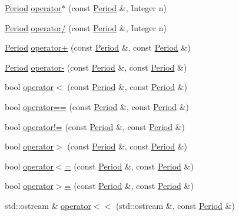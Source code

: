 \begin{DoxyCompactItemize}
\item 
\hyperlink{class_math_fin_1_1_period}{Period} \hyperlink{class_math_fin_1_1_period_adea95d933011d667b70490b0ecbf4642}{operator$\ast$} (const \hyperlink{class_math_fin_1_1_period}{Period} \&, Integer n)
\item 
\hyperlink{class_math_fin_1_1_period}{Period} \hyperlink{class_math_fin_1_1_period_a0d21ac755a75c581ad757b81ed775841}{operator/} (const \hyperlink{class_math_fin_1_1_period}{Period} \&, Integer n)
\item 
\hyperlink{class_math_fin_1_1_period}{Period} \hyperlink{class_math_fin_1_1_period_a90976f7bfed01855ca09c29295fe6f75}{operator+} (const \hyperlink{class_math_fin_1_1_period}{Period} \&, const \hyperlink{class_math_fin_1_1_period}{Period} \&)
\item 
\hyperlink{class_math_fin_1_1_period}{Period} \hyperlink{class_math_fin_1_1_period_ad2cf128e5a3ad32209f6ba15af554d07}{operator-\/} (const \hyperlink{class_math_fin_1_1_period}{Period} \&, const \hyperlink{class_math_fin_1_1_period}{Period} \&)
\item 
bool \hyperlink{class_math_fin_1_1_period_a6047127848f77402654c5f6969543d39}{operator$<$} (const \hyperlink{class_math_fin_1_1_period}{Period} \&, const \hyperlink{class_math_fin_1_1_period}{Period} \&)
\item 
bool \hyperlink{class_math_fin_1_1_period_a8db8f3ab9172629c5b4c4bf9fead21e4}{operator==} (const \hyperlink{class_math_fin_1_1_period}{Period} \&, const \hyperlink{class_math_fin_1_1_period}{Period} \&)
\item 
bool \hyperlink{class_math_fin_1_1_period_a4e4d73db93d1b0421b234e4986f02f65}{operator!=} (const \hyperlink{class_math_fin_1_1_period}{Period} \&, const \hyperlink{class_math_fin_1_1_period}{Period} \&)
\item 
bool \hyperlink{class_math_fin_1_1_period_a7031b0e272677d2c3058d6c6961dd718}{operator$>$} (const \hyperlink{class_math_fin_1_1_period}{Period} \&, const \hyperlink{class_math_fin_1_1_period}{Period} \&)
\item 
bool \hyperlink{class_math_fin_1_1_period_a433aff0d16401de60895f1866e128c0b}{operator$<$=} (const \hyperlink{class_math_fin_1_1_period}{Period} \&, const \hyperlink{class_math_fin_1_1_period}{Period} \&)
\item 
bool \hyperlink{class_math_fin_1_1_period_add05770a8cd5ae8c9e8fb16bc5e32dbc}{operator$>$=} (const \hyperlink{class_math_fin_1_1_period}{Period} \&, const \hyperlink{class_math_fin_1_1_period}{Period} \&)
\item 
std\+::ostream \& \hyperlink{class_math_fin_1_1_period_a687e398ee8fc4236d4a6d5b402ca09a6}{operator$<$$<$} (std\+::ostream \&, const \hyperlink{class_math_fin_1_1_period}{Period} \&)
\end{DoxyCompactItemize}


